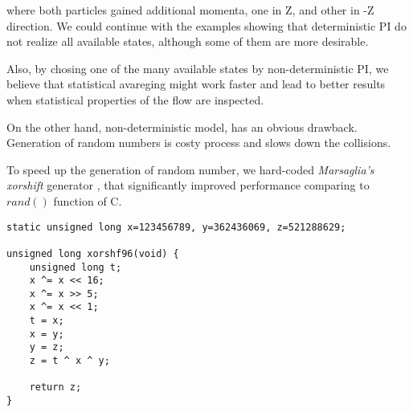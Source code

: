 where both particles gained additional momenta, one in Z, and other in -Z direction.
We could continue with the examples showing that deterministic PI do not realize all available states, although some of them are more desirable. 

Also, by chosing one of the many available states by non-deterministic PI, we believe that statistical avareging might work faster and lead to better results when statistical properties of the flow are inspected.

\bigskip

On the other hand, non-deterministic model, has an obvious drawback. Generation of random numbers is costy process and slows down the collisions.

To speed up the generation of random number, we hard-coded \textit{Marsaglia's xorshift} generator \cite{mars}, that significantly improved performance comparing to $rand()$ function of C.

\begin{lstlisting}
static unsigned long x=123456789, y=362436069, z=521288629;

unsigned long xorshf96(void) {        
	unsigned long t;
	x ^= x << 16;
	x ^= x >> 5;
	x ^= x << 1;
    t = x;
	x = y;
	y = z;
	z = t ^ x ^ y;

	return z;
}
\end{lstlisting}

